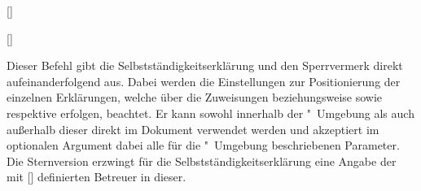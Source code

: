 \begin{Declaration*}{}
\begin{Declaration*}{}
\begin{Declaration*}{}
\begin{Declaration}{[\LParameter]}
\begin{Declaration}[v2.05]{[\LParameter]}
\begin{Declaration}{}
\begin{Declaration}[v2.02]{}
\begin{Declaration}[v2.02]{%
}
\begin{Declaration}[v2.02]{}
\begin{Declaration}{}
\begin{Declaration}{}
\begin{Declaration}{}
\begin{Declaration}{}
\begin{Declaration}{}
\printdeclarationlist%
%
Dieser Befehl gibt die Selbstständigkeitserklärung und den Sperrvermerk direkt 
aufeinanderfolgend aus. Dabei werden die Einstellungen zur Positionierung der 
einzelnen Erklärungen, welche über die Zuweisungen  
beziehungsweise  sowie  
respektive  erfolgen, beachtet. Er kann sowohl 
innerhalb der "~Umgebung als auch außerhalb dieser 
direkt im Dokument verwendet werden und akzeptiert im optionalen Argument dabei 
alle für die "~Umgebung beschriebenen Parameter. 
Die Sternversion erzwingt für die Selbstständigkeitserklärung eine Angabe der 
mit [] definierten Betreuer in dieser.
\end{Declaration}
\end{Declaration}
\end{Declaration}
\end{Declaration}
\end{Declaration}
\end{Declaration}
\end{Declaration}
\end{Declaration}
\end{Declaration}
\end{Declaration}
\end{Declaration}


\end{Declaration*}
\end{Declaration*}
\end{Declaration*}
